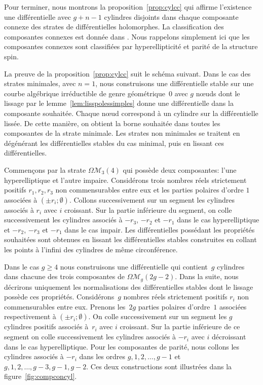 \documentclass[JEP,XML,SOM,Unicode,francais,NoFloatCountersInSection,published]{cedram}
\let\mathcal\mathscr
\newcommand{\omoduli}[1][g]{{\Omega\mathcal M}_{\!#1}}
\theoremstyle{definition}
\begin{document}
Pour terminer, nous montrons la proposition~\ref{prop:cylcc} qui affirme l'existence une différentielle avec $g+n-1$ cylindres disjoints dans chaque composante connexe des strates de différentielles holomorphes. La classification des composantes connexes est donnée dans \cite[Th.\,1\,\&\,2]{kozo}. Nous rappelons simplement ici que les composantes connexes sont classifiées par hyperellipticité et parité de la structure spin.

La preuve de la proposition~\ref{prop:cylcc} suit le schéma suivant. Dans le cas des strates minimales, \ie avec $n=1$, nous construisons une différentielle stable sur une courbe algébrique irréductible de genre géométrique~$0$ avec $g$ nœuds dont le lissage par le lemme~\ref{lem:lisspolessimples} donne une différentielle dans la composante souhaitée. Chaque nœud correspond à un cylindre sur la différentielle lissée. De cette manière, on obtient la borne souhaitée dans toutes les composantes de la strate minimale. Les strates non minimales se traitent en dégénérant les différentielles stables du cas minimal, puis en lissant ces différentielles.

Commençons par la strate $\omoduli[3](4)$ qui possède deux composantes: l'une hyper\-elliptique et l'autre impaire. Considérons trois nombres réels strictement positifs $r_{1},r_{2},r_{3}$ non commensurables entre eux et les parties polaires d'ordre $1$ associées à $(\pm r_{i};\emptyset)$. Collons successivement sur un segment les cylindres associés à $r_{i}$ avec $i$ croissant. Sur la partie inférieure du segment, on colle successivement les cylindres associés à $-r_{3}$, $-r _{2}$ et $-r_{1}$ dans le cas hyperelliptique et $-r_{2}$, $-r_{3}$ et $-r_{1}$ dans le cas impair. Les différentielles possédant les propriétés souhaitées sont obtenues en lissant les différentielles stables construites en collant les points à l'infini des cylindres de même circonférence.

Dans le cas $g\geq4$ nous construisons une différentielle qui contient~$g$ cylindres dans chacune des trois composantes de $\omoduli(2g-2)$. Dans la suite, nous décrirons uniquement les normalisations des différentielles stables dont le lissage possède ces propriétés. Considérons~$g$ nombres réels strictement positifs $r_{i}$ non commensurables entre eux. Prenons les~$2g$ parties polaires d'ordre~$1$ associées respectivement à $(\pm r_{i};\emptyset)$. On colle successivement sur un segment les $g$ cylindres positifs associés à~$r_{i}$ avec $i$ croissant. Sur la partie inférieure de ce segment on colle successivement les cylindres associés à $-r_{i}$ avec $i$ décroissant dans le cas hyperelliptique. Pour les composantes de parité, nous collons les cylindres associés à $-r_{i}$ dans les ordres $g,1,2,\dots,g-1$ et $g,1,2,\dots,g-3,g-1,g-2$. Ces deux constructions sont illustrées dans la figure~\ref{fig:compconcyl}.
\end{document}
